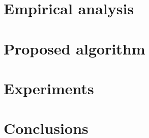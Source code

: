 \documentclass[letterpaper]{article}
\begin{document}
\section{Empirical analysis}

\section{Proposed algorithm}

\section{Experiments}

\section{Conclusions}



\end{document}
